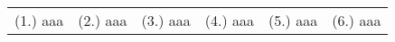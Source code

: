 {\begin{center}
\end{center}


\par \practiceinfo
\par \begin{tabular}[h]{cccccc}
(1.) aaa &
(2.) aaa &
(3.) aaa &
(4.) aaa &
(5.) aaa &
(6.) aaa \\
\end{tabular}}
\pagebreak
